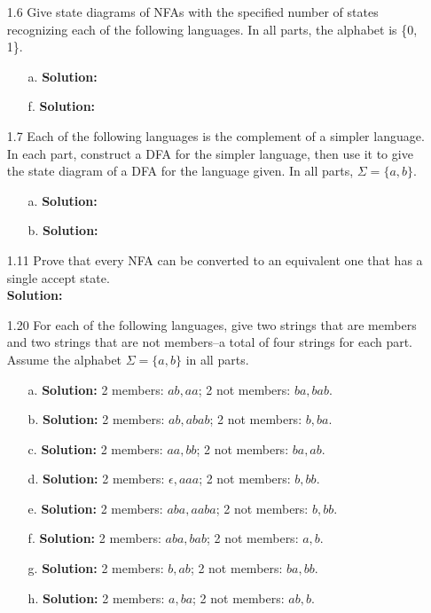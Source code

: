 \begin{enumerate}
\item[1.6]Give state diagrams of NFAs with the specified number of states recognizing each of the following languages. In all parts, the alphabet is \{0, 1\}.
\begin{enumerate}
\item[a.]\textbf{Solution:} \alreadyanswered
\item[f.]\textbf{Solution:} \alreadyanswered
\end{enumerate}

\item[1.7]Each of the following languages is the complement of a simpler language. In each part, construct a DFA for the simpler language, then use it to give the state diagram of a DFA for the language given. In all parts, $\Sigma = \{a, b\}$.
\begin{enumerate}
\item[a.]\textbf{Solution:} \alreadyanswered
\item[b.]\textbf{Solution:} \alreadyanswered
\end{enumerate}

\item[1.11]Prove that every NFA can be converted to an equivalent one that has a single accept state.
\\
\textbf{Solution:} \alreadyanswered

\item[1.20]For each of the following languages, give two strings that are members and two strings that are not members--a total of four strings for each part. Assume the alphabet $\Sigma = \{a,b\}$ in all parts.
\begin{enumerate}
\item[a.]\textbf{Solution:} 2 members: $ab, aa$; 2 not members: $ba, bab$.
\item[b.]\textbf{Solution:} 2 members: $ab, abab$; 2 not members: $b, ba$.
\item[c.]\textbf{Solution:} 2 members: $aa, bb$; 2 not members: $ba, ab$.
\item[d.]\textbf{Solution:} 2 members: $\epsilon, aaa$; 2 not members: $b, bb$.
\item[e.]\textbf{Solution:} 2 members: $aba, aaba$; 2 not members: $b, bb$.
\item[f.]\textbf{Solution:} 2 members: $aba, bab$; 2 not members: $a, b$.
\item[g.]\textbf{Solution:} 2 members: $b, ab$; 2 not members: $ba, bb$.
\item[h.]\textbf{Solution:} 2 members: $a, ba$; 2 not members: $ab, b$.
\end{enumerate}


\end{enumerate}
